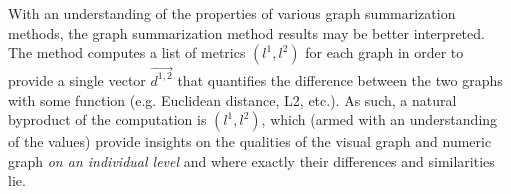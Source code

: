 With an understanding of the properties of various graph summarization methods, 
the graph summarization method results may be better interpreted. The method 
computes a list of metrics $(l^1,l^2)$ for each graph in order to provide a 
single vector $\overrightarrow{d^{1,2}}$ that quantifies the difference 
between the two graphs with some function (e.g. Euclidean distance, L2, etc.). 
As such, a natural byproduct of the computation is $(l^1,l^2)$, which (armed 
with an understanding of the values) provide insights on the qualities of the 
visual graph and numeric graph \textit{on an individual level} and where 
exactly their differences and similarities lie.